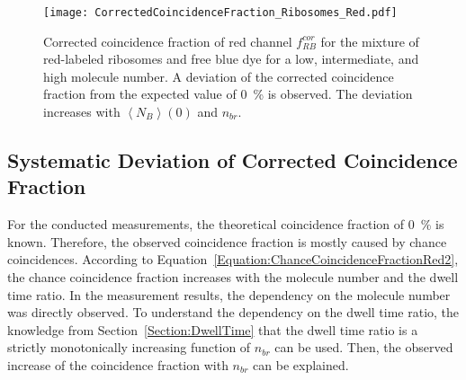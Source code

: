 \begin{figure}[h!]
	\centering
	\texttt{[image: CorrectedCoincidenceFraction\_Ribosomes\_Red.pdf]}
	\caption[Corrected coincidence fraction of red channel for mixture of red-labeled ribosomes and free blue dye]{Corrected coincidence fraction of red channel $f_{RB}^{cor}$ for the mixture of red-labeled ribosomes and free blue dye for a low, intermediate, and high molecule number. A deviation of the corrected coincidence fraction from the expected value of \SI{0}{\percent} is observed. The deviation increases with $\left\langle N_B \right\rangle (0)$ and $n_{br}$.}
	\label{fig:CorrectedCoincidenceFraction_Ribosomes_Red}
\end{figure}

\subsection{Systematic Deviation of Corrected Coincidence Fraction}

For the conducted measurements, the theoretical coincidence fraction of \SI{0}{\percent} is known. Therefore, the observed coincidence fraction is mostly caused by chance coincidences. According to Equation~\eqref{Equation:ChanceCoincidenceFractionRed2}, the chance coincidence fraction increases with the molecule number and the dwell time ratio. In the measurement results, the dependency on the molecule number was directly observed. To understand the dependency on the dwell time ratio, the knowledge from Section~\ref{Section:DwellTime} that the dwell time ratio is a strictly monotonically increasing function of $n_{br}$ can be used. Then, the observed increase of the coincidence fraction with $n_{br}$ can be explained.\\

